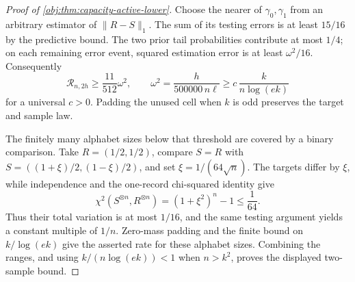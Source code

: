 \begin{proof}[Proof of \cref{obj:thm:capacity-active-lower}]
Choose the nearer of \(\gamma_0,\gamma_1\) from an arbitrary estimator of \(\|R-S\|_1\). The sum of its testing errors is at least \(15/16\) by the predictive bound. The two prior tail probabilities contribute at most \(1/4\); on each remaining error event, squared estimation error is at least \(\omega^2/16\). Consequently
\[
\mathcal R_{n,2h}\ge\frac{11}{512}\omega^2,
\qquad
\omega^2=\frac{h}{500000\,n\ell}
\ge c\,\frac{k}{n\log(ek)}
\]
for a universal \(c>0\). Padding the unused cell when \(k\) is odd preserves the target and sample law. %

The finitely many alphabet sizes below that threshold are covered by a binary comparison. Take \(R=(1/2,1/2)\), compare \(S=R\) with
\(S=((1+\xi)/2,(1-\xi)/2)\), and set \(\xi=1/(64\sqrt n)\). The targets differ by \(\xi\), while independence and the one-record chi-squared identity give
\[
\chi^2(S^{\otimes n},R^{\otimes n})
=(1+\xi^2)^n-1\le\frac1{64}.
\] %
Thus their total variation is at most \(1/16\), and the same testing argument yields a constant multiple of \(1/n\). Zero-mass padding and the finite bound on \(k/\log(ek)\) give the asserted rate for these alphabet sizes. Combining the ranges, and using \(k/(n\log(ek))<1\) when \(n>k^2\), proves the displayed two-sample bound. %


\end{proof}
